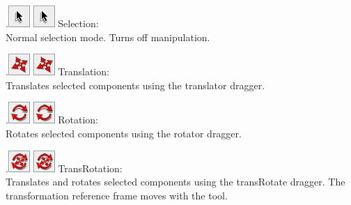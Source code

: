 \documentclass{article}
\begin{document}
\iflatexml
.\includegraphics[]{images/selectTool}
\else
\includegraphics[width=.33in]{images/selectTool}
\fi
{\sf Selection:}\\
Normal selection mode. Turns off manipulation.

\vspace{\parskip}
\iflatexml
.\includegraphics[]{images/translateTool}
\else
\includegraphics[width=.33in]{images/translateTool}
\fi
{\sf Translation:}\\
Translates selected components using the translator dragger.

\vspace{\parskip}
\iflatexml
.\includegraphics[]{images/rotateTool}
\else
\includegraphics[width=.33in]{images/rotateTool}
\fi
{\sf Rotation:}\\
Rotates selected components using the rotator dragger.

\vspace{\parskip}
\iflatexml
.\includegraphics[]{images/transRotateTool}
\else
\includegraphics[width=.33in]{images/transRotateTool}
\fi
{\sf TransRotation:}\\
Translates and rotates selected components
using the transRotate dragger. The transformation reference frame
moves with the tool.
\end{document}
